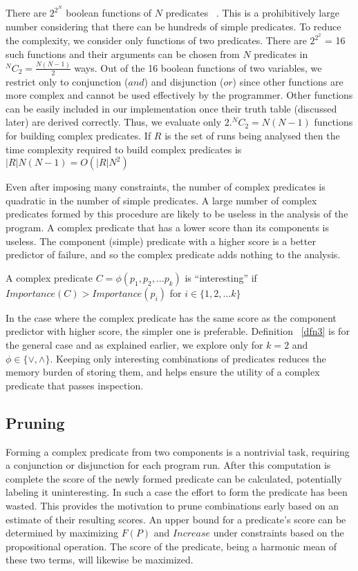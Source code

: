 There are $2^{2^N}$ boolean functions of $N$ predicates ~\cite{MathWorld:BoolFuncs}.  This is a prohibitively large number considering that there can be hundreds of simple predicates.  To reduce the complexity, we consider only functions of two predicates.  There are $2^{2^2}$ = 16 such functions and their arguments can be chosen from $N$ predicates in $^NC_2 = \frac{N(N-1)}{2}$ ways.  Out of the 16 boolean functions of two variables, we restrict only to conjunction ($and$) and disjunction ($or$) since other functions are more complex and cannot be used effectively by the programmer.  Other functions can be easily included in our implementation once their truth table (discussed later) are derived correctly.  Thus, we evaluate only $2. ^NC_2 = N(N-1)$ functions for building complex predicates.  If $R$ is the set of runs being analysed then the time complexity required to build complex predicates is $|R|N(N-1) = O(|R|N^2)$

Even after imposing many constraints, the number of complex predicates is quadratic in the number of simple predicates.  A large number of complex predicates formed by this procedure are likely to be useless in the analysis of the program.  A complex predicate that has a lower score than its components is useless.  The component (simple) predicate with a higher score is a better predictor of failure, and so the complex predicate adds nothing to the analysis.

\begin{defn}
\label{dfn3}
A complex predicate $C = \phi(p_1, p_2, \ldots p_k)$ is ``interesting'' if $Importance(C) > Importance(p_i)$ for $i \in \{1, 2, \ldots k\}$
\end{defn}

In the case where the complex predicate has the same score as the component predictor with higher score, the simpler one is preferable.  Definition ~\ref{dfn3} is for the general case and as explained earlier, we explore only for $k = 2$ and $\phi \in \{\vee, \wedge\}$.  Keeping only interesting combinations of predicates reduces the memory burden of storing them, and helps ensure the utility of a complex predicate that passes inspection.

\subsection{Pruning}
Forming a complex predicate from two components is a nontrivial task, requiring a conjunction or disjunction for each program run.  After this computation is complete the score of the newly formed predicate can be calculated, potentially labeling it uninteresting.  In such a case the effort to form the predicate has been wasted.  This provides the motivation to prune combinations early based on an estimate of their resulting scores.  An upper bound for a predicate's score can be determined by maximizing $F(P)$ and $Increase$ under constraints based on the propositional operation.  The score of the predicate, being a harmonic mean of these two terms, will likewise be maximized.

